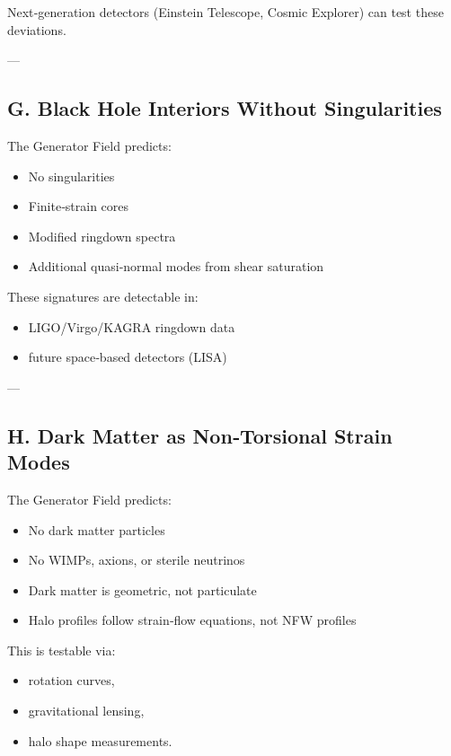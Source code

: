 \documentclass[reprint,amsmath,amssymb,aps,prl,floatfix]{revtex4-2}
\begin{document}
\begin{itemize}
Next‑generation detectors (Einstein Telescope, Cosmic Explorer) can test these deviations.

---

\subsection{G. Black Hole Interiors Without Singularities}

The Generator Field predicts:

\begin{itemize}
\item No singularities  
\item Finite‑strain cores  
\item Modified ringdown spectra  
\item Additional quasi‑normal modes from shear saturation
\end{itemize}

These signatures are detectable in:

\begin{itemize}
\item LIGO/Virgo/KAGRA ringdown data  
\item future space‑based detectors (LISA)
\end{itemize}

---

\subsection{H. Dark Matter as Non‑Torsional Strain Modes}

The Generator Field predicts:

\begin{itemize}
\item No dark matter particles  
\item No WIMPs, axions, or sterile neutrinos  
\item Dark matter is geometric, not particulate  
\item Halo profiles follow strain‑flow equations, not NFW profiles
\end{itemize}

This is testable via:

\begin{itemize}
\item rotation curves,  
\item gravitational lensing,  
\item halo shape measurements.
\end{itemize}


\end{itemize}
\end{document}
